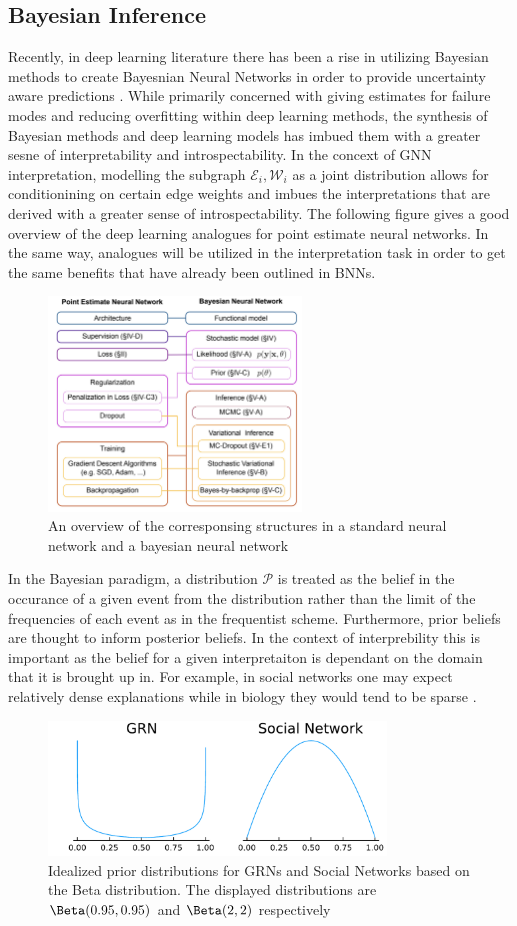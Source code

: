 \subsection{Bayesian Inference}
Recently, in deep learning literature there has been a rise in utilizing Bayesian methods to create Bayesnian Neural Networks in order to provide uncertainty aware predictions \cite{jospin_hands-bayesian_2022}. While primarily concerned with giving estimates for failure modes and reducing overfitting within deep learning methods, the synthesis of Bayesian methods and deep learning models has imbued them with a greater sesne of interpretability and introspectability. In the concext of GNN interpretation, modelling the subgraph $\mathcal{E}_i, \mathcal{W}_i$ as a joint distribution allows for conditionining on certain edge weights and imbues the interpretations that are derived with a greater sense of introspectability. The following figure gives a good overview of the deep learning analogues for point estimate neural networks. In the same way, analogues will be utilized in the interpretation task in order to get the same benefits that have already been outlined in BNNs.
\begin{figure}[H]
  \centering
  \includegraphics[width=0.6\textwidth]{images/bnn.jpeg}
  \caption{An overview of the corresponsing structures in a standard neural network and a bayesian neural network}
\end{figure}
In the Bayesian paradigm, a distribution $\mathcal{P}$ is treated as the belief in the occurance of a given event from the distribution rather than the limit of the frequencies of each event as in the frequentist scheme. Furthermore, prior beliefs are thought to inform posterior beliefs. In the context of interprebility this is important as the belief for a given interpretaiton is dependant on the domain that it is brought up in. For example, in social networks one may expect relatively dense explanations while in biology they would tend to be sparse \cite{cho_friendship_2011} \cite{petralia_new_2016}.
\begin{figure}[H]
  \centering
  \includegraphics[width=0.8\textwidth]{images/prior.pdf}
  \caption{Idealized prior distributions for GRNs and Social Networks based on the Beta distribution. The displayed distributions are $\Beta(0.95, 0.95)$ and $\Beta(2, 2)$ respectively}
\end{figure}